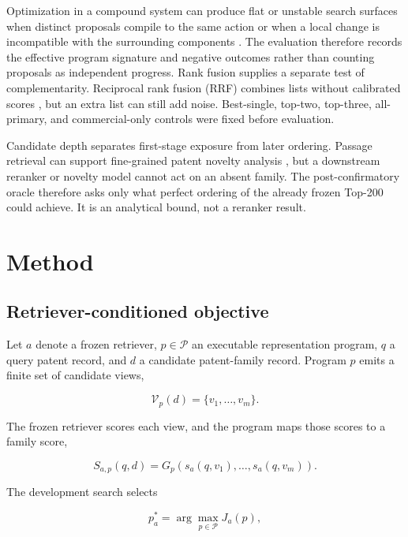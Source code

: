 \documentclass[final,5p,times,twocolumn]{elsarticle}
\begin{document}
Optimization in a compound system can produce flat or unstable search
surfaces when distinct proposals compile to the same action or when a local
change is incompatible with the surrounding components
\cite{promptcoinflip2026}. The evaluation therefore records the effective
program signature and negative outcomes rather than counting proposals as
independent progress.
Rank fusion supplies a separate test of complementarity. Reciprocal rank
fusion (RRF) combines lists without calibrated scores \cite{rrf2009}, but an
extra list can still add noise. Best-single, top-two, top-three, all-primary,
and commercial-only controls were fixed before evaluation.

Candidate depth separates first-stage exposure from later ordering. Passage
retrieval can support fine-grained patent novelty analysis
\cite{finepatents2026}, but a downstream reranker or novelty model cannot act
on an absent family. The post-confirmatory oracle therefore asks only what
perfect ordering of the already frozen Top-200 could achieve. It is an
analytical bound, not a reranker result.

\section{Method}

\subsection{Retriever-conditioned objective}

Let \(a\) denote a frozen retriever, \(p\in\mathcal{P}\) an executable
representation program, \(q\) a query patent record, and \(d\) a candidate
patent-family record. Program \(p\) emits a finite set of candidate views,

\begin{equation}
 \mathcal{V}_{p}(d)=\{v_1,\ldots,v_m\}.
\end{equation}

The frozen retriever scores each view, and the program maps those scores to a
family score,

\begin{equation}
 S_{a,p}(q,d)=G_p\!\left(s_a(q,v_1),\ldots,s_a(q,v_m)\right).
\end{equation}

The development search selects

\begin{equation}
 p_a^{*}=\arg\max_{p\in\mathcal{P}}J_a(p),
\end{equation}
\end{document}
